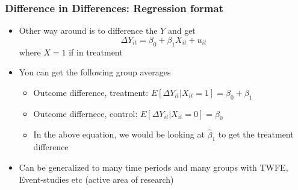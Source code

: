 \documentclass[aspectratio=169]{beamer}
\begin{document}
\begin{frame}
\frametitle{Difference in Differences: Regression format}
\begin{itemize}
\item Other way around is to difference the $Y$ and get
\[
\Delta Y_{it} = \beta_0 + \beta_1 X_{it} + u_{it}
\]
where $X=1$ if in treatment
\item You can get the following group averages
\begin{itemize}
\item Outcome difference, treatment: $E[\Delta  Y_{it}|X_{it}=1] = \beta_0+\beta_1$
\item Outcome differnece, control: $E[\Delta Y_{it}|X_{it}=0] =\beta_0 $ 
\end{itemize}
\begin{itemize}
\item In the above equation, we would be looking at $\hat{\beta}_1$ to get the treatment difference
\end{itemize}
\item Can be generalized to many time periods and many groups with TWFE, Event-studies etc (active area of research)
\end{itemize}
\end{frame}
\end{document}
